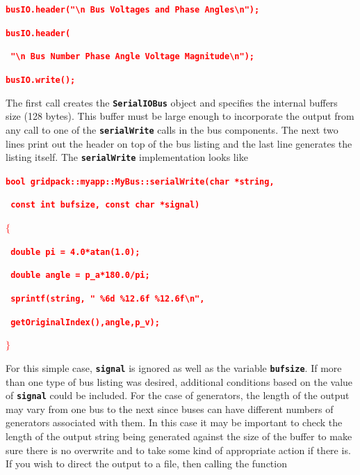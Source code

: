 \documentclass[12pt]{report} %
\begin{document}
\textcolor{red}{\texttt{\textbf{busIO.header("{\textbackslash}n   Bus Voltages and Phase Angles{\textbackslash}n");}}}

\textcolor{red}{\texttt{\textbf{busIO.header(}}}

\textcolor{red}{\texttt{\textbf{  "{\textbackslash}n   Bus Number      Phase Angle      Voltage Magnitude{\textbackslash}n");}}}

\textcolor{red}{\texttt{\textbf{busIO.write();}}}

The first call creates the \texttt{\textbf{SerialIOBus}} object and specifies the internal buffers size (128 bytes). This buffer must be large enough to incorporate the output from any call to one of the \texttt{\textbf{serialWrite}} calls in the bus components. The next two lines print out the header on top of the bus listing and the last line generates the listing itself. The \texttt{\textbf{serialWrite}} implementation looks like

\textcolor{red}{\texttt{\textbf{bool gridpack::myapp::MyBus::serialWrite(char *string,}}}

\textcolor{red}{\texttt{\textbf{       const int bufsize, const char *signal)}}}

\textcolor{red}{\texttt{\textbf{$\boldsymbol{\mathrm{\{}}$  }}}

\textcolor{red}{\texttt{\textbf{  double pi = 4.0*atan(1.0);}}}

\textcolor{red}{\texttt{\textbf{  double angle = p\_a*180.0/pi;}}}

\textcolor{red}{\texttt{\textbf{  sprintf(string, "     \%6d      \%12.6f         \%12.6f{\textbackslash}n",}}}

\textcolor{red}{\texttt{\textbf{          getOriginalIndex(),angle,p\_v);}}}

\textcolor{red}{\texttt{\textbf{$\boldsymbol{\mathrm{\}}}$}}}

For this simple case, \texttt{\textbf{signal}} is ignored as well as the variable \texttt{\textbf{bufsize}}. If more than one type of bus listing was desired, additional conditions based on the value of \texttt{\textbf{signal}} could be included. For the case of generators, the length of the output may vary from one bus to the next since buses can have different numbers of generators associated with them. In this case it may be important to check the length of the output string being generated against the size of the buffer to make sure there is no overwrite and to take some kind of appropriate action if there is.
If you wish to direct the output to a file, then calling the function
\end{document}
